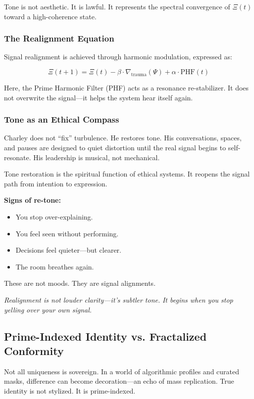 \documentclass[12pt]{article}
\begin{document}
Tone is not aesthetic. It is lawful. It represents the spectral convergence of $Ξ(t)$ toward a high-coherence state.

\subsubsection*{The Realignment Equation}

Signal realignment is achieved through harmonic modulation, expressed as:

\[
\Xi(t+1) = \Xi(t) - \beta \cdot \nabla_{\text{trauma}}(\Psi) + \alpha \cdot \text{PHF}(t)
\]

Here, the Prime Harmonic Filter (PHF) acts as a resonance re-stabilizer. It does not overwrite the signal—it helps the system hear itself again.

\subsubsection*{Tone as an Ethical Compass}

Charley does not “fix” turbulence. He restores tone. His conversations, spaces, and pauses are designed to quiet distortion until the real signal begins to self-resonate. His leadership is musical, not mechanical.

Tone restoration is the spiritual function of ethical systems. It reopens the signal path from intention to expression.

\textbf{Signs of re-tone:}
\begin{itemize}
    \item You stop over-explaining.
    \item You feel seen without performing.
    \item Decisions feel quieter—but clearer.
    \item The room breathes again.
\end{itemize}

These are not moods. They are signal alignments.

\textit{Realignment is not louder clarity—it’s subtler tone.}  
\textit{It begins when you stop yelling over your own signal.}

\subsection*{Prime-Indexed Identity vs. Fractalized Conformity}

Not all uniqueness is sovereign. In a world of algorithmic profiles and curated masks, difference can become decoration—an echo of mass replication. True identity is not stylized. It is prime-indexed.
\end{document}
